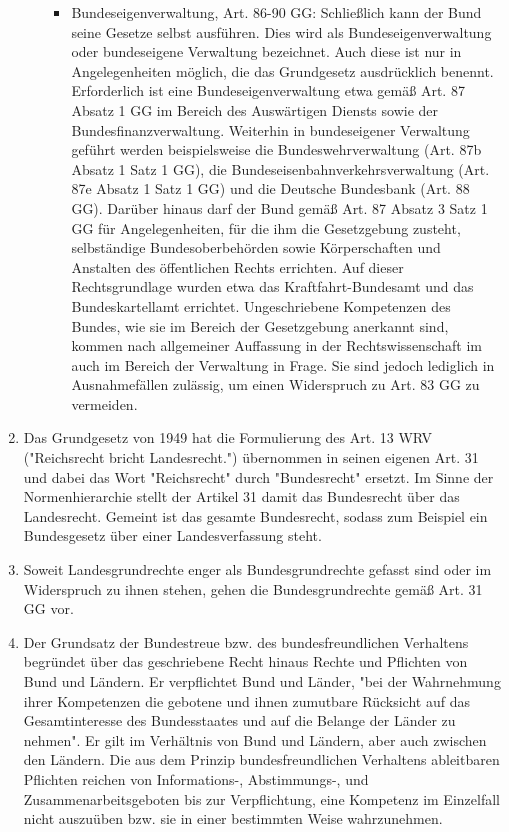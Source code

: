 \documentclass{article}
\begin{document}
\begin{enumerate}[label=(\alph*)]
\begin{itemize}
\begin{itemize}
				\item Bundeseigenverwaltung, Art. 86-90 GG: Schließlich kann der Bund seine Gesetze selbst ausführen. Dies wird als Bundeseigenverwaltung oder bundeseigene Verwaltung bezeichnet. Auch diese ist nur in Angelegenheiten möglich, die das Grundgesetz ausdrücklich benennt. Erforderlich ist eine Bundeseigenverwaltung etwa gemäß Art. 87 Absatz 1 GG im Bereich des Auswärtigen Diensts sowie der Bundesfinanzverwaltung. Weiterhin in bundeseigener Verwaltung geführt werden beispielsweise die Bundeswehrverwaltung (Art. 87b Absatz 1 Satz 1 GG), die Bundeseisenbahnverkehrsverwaltung (Art. 87e Absatz 1 Satz 1 GG) und die Deutsche Bundesbank (Art. 88 GG). Darüber hinaus darf der Bund gemäß Art. 87 Absatz 3 Satz 1 GG für Angelegenheiten, für die ihm die Gesetzgebung zusteht, selbständige Bundesoberbehörden sowie Körperschaften und Anstalten des öffentlichen Rechts errichten. Auf dieser Rechtsgrundlage wurden etwa das Kraftfahrt-Bundesamt und das Bundeskartellamt errichtet. Ungeschriebene Kompetenzen des Bundes, wie sie im Bereich der Gesetzgebung anerkannt sind, kommen nach allgemeiner Auffassung in der Rechtswissenschaft im auch im Bereich der Verwaltung in Frage. Sie sind jedoch lediglich in Ausnahmefällen zulässig, um einen Widerspruch zu Art. 83 GG zu vermeiden.
			\end{itemize}
		\end{itemize}
		\item Das Grundgesetz von 1949 hat die Formulierung des Art. 13 WRV ("Reichsrecht bricht Landesrecht.") übernommen in seinen eigenen Art. 31 und dabei das Wort "Reichsrecht" durch "Bundesrecht" ersetzt. Im Sinne der Normenhierarchie stellt der Artikel 31 damit das Bundesrecht über das Landesrecht. Gemeint ist das gesamte Bundesrecht, sodass zum Beispiel ein Bundesgesetz über einer Landesverfassung steht.
		\item Soweit Landesgrundrechte enger als Bundesgrundrechte gefasst sind oder im Widerspruch zu ihnen stehen, gehen die Bundesgrundrechte gemäß Art. 31 GG vor.
		\item Der Grundsatz der Bundestreue bzw. des bundesfreundlichen Verhaltens begründet über das geschrieb\-ene Recht hinaus Rechte und Pflichten von Bund und Ländern. Er verpflichtet Bund und Länder, "bei der Wahrnehmung ihrer Kompetenzen die gebotene und ihnen zumutbare Rücksicht auf das Gesamtinteresse des Bundesstaates und auf die Belange der Länder zu nehmen". Er gilt im Verhältnis von Bund und Ländern, aber auch zwischen den Ländern. Die aus dem Prinzip bundesfreundlichen Verhaltens ableitbaren Pflichten reichen von Informations-, Abstimmungs-, und Zusammenarbeitsgeboten bis zur Verpflichtung, eine Kompetenz im Einzelfall nicht auszuüben bzw. sie in einer bestimmten Weise wahrzunehmen.
	\end{enumerate}
	
\end{document}
